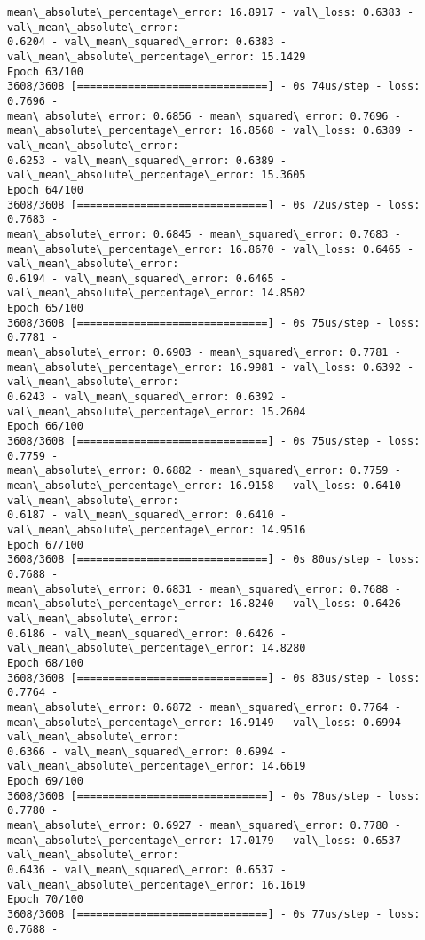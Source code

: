\documentclass[11pt]{article}
\begin{document}
\begin{Verbatim}[commandchars=\\\{\},fontsize=\footnotesize]
mean\_absolute\_percentage\_error: 16.8917 - val\_loss: 0.6383 - val\_mean\_absolute\_error:
0.6204 - val\_mean\_squared\_error: 0.6383 - val\_mean\_absolute\_percentage\_error: 15.1429
Epoch 63/100
3608/3608 [==============================] - 0s 74us/step - loss: 0.7696 -
mean\_absolute\_error: 0.6856 - mean\_squared\_error: 0.7696 -
mean\_absolute\_percentage\_error: 16.8568 - val\_loss: 0.6389 - val\_mean\_absolute\_error:
0.6253 - val\_mean\_squared\_error: 0.6389 - val\_mean\_absolute\_percentage\_error: 15.3605
Epoch 64/100
3608/3608 [==============================] - 0s 72us/step - loss: 0.7683 -
mean\_absolute\_error: 0.6845 - mean\_squared\_error: 0.7683 -
mean\_absolute\_percentage\_error: 16.8670 - val\_loss: 0.6465 - val\_mean\_absolute\_error:
0.6194 - val\_mean\_squared\_error: 0.6465 - val\_mean\_absolute\_percentage\_error: 14.8502
Epoch 65/100
3608/3608 [==============================] - 0s 75us/step - loss: 0.7781 -
mean\_absolute\_error: 0.6903 - mean\_squared\_error: 0.7781 -
mean\_absolute\_percentage\_error: 16.9981 - val\_loss: 0.6392 - val\_mean\_absolute\_error:
0.6243 - val\_mean\_squared\_error: 0.6392 - val\_mean\_absolute\_percentage\_error: 15.2604
Epoch 66/100
3608/3608 [==============================] - 0s 75us/step - loss: 0.7759 -
mean\_absolute\_error: 0.6882 - mean\_squared\_error: 0.7759 -
mean\_absolute\_percentage\_error: 16.9158 - val\_loss: 0.6410 - val\_mean\_absolute\_error:
0.6187 - val\_mean\_squared\_error: 0.6410 - val\_mean\_absolute\_percentage\_error: 14.9516
Epoch 67/100
3608/3608 [==============================] - 0s 80us/step - loss: 0.7688 -
mean\_absolute\_error: 0.6831 - mean\_squared\_error: 0.7688 -
mean\_absolute\_percentage\_error: 16.8240 - val\_loss: 0.6426 - val\_mean\_absolute\_error:
0.6186 - val\_mean\_squared\_error: 0.6426 - val\_mean\_absolute\_percentage\_error: 14.8280
Epoch 68/100
3608/3608 [==============================] - 0s 83us/step - loss: 0.7764 -
mean\_absolute\_error: 0.6872 - mean\_squared\_error: 0.7764 -
mean\_absolute\_percentage\_error: 16.9149 - val\_loss: 0.6994 - val\_mean\_absolute\_error:
0.6366 - val\_mean\_squared\_error: 0.6994 - val\_mean\_absolute\_percentage\_error: 14.6619
Epoch 69/100
3608/3608 [==============================] - 0s 78us/step - loss: 0.7780 -
mean\_absolute\_error: 0.6927 - mean\_squared\_error: 0.7780 -
mean\_absolute\_percentage\_error: 17.0179 - val\_loss: 0.6537 - val\_mean\_absolute\_error:
0.6436 - val\_mean\_squared\_error: 0.6537 - val\_mean\_absolute\_percentage\_error: 16.1619
Epoch 70/100
3608/3608 [==============================] - 0s 77us/step - loss: 0.7688 -

\end{Verbatim}
\end{document}
